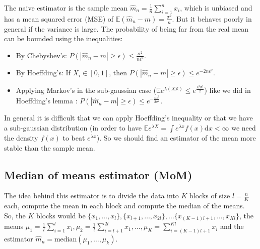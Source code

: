 \documentclass[11pt, english]{article}
\begin{document}
The naive estimator is the sample mean $\hat{m}_n=\frac{1}{n}\sum\limits_{i=1}^n x_i$, which is unbiased and has a mean squared error (MSE) of $\mathbb{E}(\hat{m}_n-m)=\frac{\sigma^2}{n}$. But it behaves poorly in general if the variance is large. The probability of being far from the real mean can be bounded using the inequalities:
\begin{itemize}
	\item By Chebyshev's: $P(|\hat{m}_n-m|\geq \epsilon)\leq\frac{\sigma^2}{n\epsilon^2}$.
	\item By Hoeffding's: If $X_i\in [0,1]$, then $P(|\hat{m}_n-m|\geq \epsilon)\leq e^{-2n\epsilon^2}$.
	\item Applying Markov's in the sub-gaussian case ($\mathbb{E}e^{\lambda(X\mathbb{X})}\leq e^{\frac{\lambda^2\sigma^2}{2}}$) like we did in Hoeffding's lemma : $P(|\hat{m}_n-m|\geq \epsilon)\leq e^{-\frac{n\epsilon^2}{2\sigma^2}}$. 
\end{itemize}
In general it is difficult that we can apply Hoeffding's inequality or that we have a sub-gaussian distribution (in order to have $\mathbb{E}e^{\lambda X}=\int e^{\lambda x}f(x)\text{d}x<\infty$ we need the density $f(x)$ to beat $e^{\lambda x}$). So we should find an estimator of the mean more stable than the sample mean.

\subsection{Median of means estimator (MoM)}

The idea behind this estimator is to divide the data into $K$ blocks of size $l=\frac{n}{K}$ each, compute the mean in each block and compute the median of the means. \\

So, the $K$ blocks would be $\{x_1,\dots,x_l\},\{x_{l+1},\dots,x_{2l}\},\dots\{x_{(K-1)l+1},\dots,x_{Kl}\}$, the means $\mu_1=\frac{1}{l}\sum\limits_{i=1}^l x_i,\mu_2=\frac{1}{l}\sum\limits_{i=l+1}^{2l}x_1,\dots,\mu_K=\sum\limits_{i=(K-1)l+1}^{Kl}x_i$ and the estimator $\hat{m}_n=\text{median}(\mu_1,\dots,\mu_k)$.\\
\end{document}
